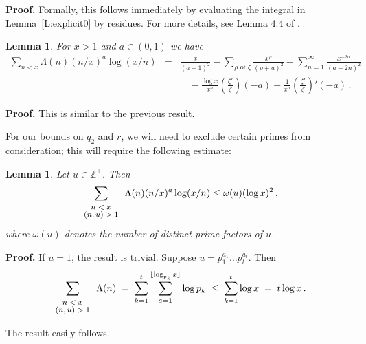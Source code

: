 \documentclass{amsart}
\newtheorem{lemma}[theorem]{Lemma}
\numberwithin{equation}{section}
\numberwithin{table}{section}
\begin{document}
\noindent\textbf{Proof.}
Formally, this follows immediately by evaluating the integral in Lemma~\ref{L:explicit0} by residues.
For more details, see Lemma 4.4 of \cite{bach:1990}.
{\raisebox{-.25ex}{\scalebox{.786}[1.272]{$\blacksquare$}}}

\begin{lemma}\label{L:explicit2}
  For $x>1$ and $a\in(0,1)$ we have
  \begin{eqnarray*}
  \sum_{n<x}
  \Lambda(n)(n/x)^a\log(x/n)
  &=&
   \frac{x}{(a+1)^2}
  -
  \sum_{\rho\text{ of $\zeta$}}
  \frac{x^\rho}{(\rho+a)^2}
   -
  \sum_{n=1}^\infty
  \frac{x^{-2n}}{(a-2n)^2}
  \\
  &&
  \quad
  -
  \frac{\log x}{x^a}
  \left(\frac{\zeta'}{\zeta}\right)(-a)
  -
  \frac{1}{x^a}
  \left(\frac{\zeta'}{\zeta}\right)'(-a)
  \,.
  \end{eqnarray*}
\end{lemma}

\noindent\textbf{Proof.}
This is similar to the previous result.
{\raisebox{-.25ex}{\scalebox{.786}[1.272]{$\blacksquare$}}}

\vspace{1ex}

For our bounds on $q_2$ and $r$, we will need to exclude certain primes
from consideration; this will require the following estimate:
\begin{lemma}\label{L:sumbound}
 Let $u\in{\mathbb{Z}}^+$.  Then
 $$ 
  \sum_{\footnotesize{\begin{array}{cc}n<x\\[-.5ex](n,u)>1\end{array}}}
 \Lambda(n)
 (n/x)^a
 \log(x/n) 
 \leq
 \omega(u)(\log x)^2
 \,,
 $$
 where $\omega(u)$ denotes the number of distinct prime factors of $u$.
\end{lemma}

\noindent\textbf{Proof.}
If $u=1$, the result is trivial.
Suppose $u=p_1^{a_1}\dots p_t^{a_t}$.  Then
\begin{eqnarray*}
  \sum_{\footnotesize{\begin{array}{cc}n<x\\[-.5ex](n,u)>1\end{array}}}
  \Lambda(n)
   \;=\;
   \sum_{k=1}^t
   \sum_{a=1}^{\lfloor \log_{p_k}x\rfloor}
   \log p_k
   \;\leq\;
   \sum_{k=1}^t
   \log x
   \;=\;
   t\log x
   \,.
\end{eqnarray*}

The result easily follows.
{\raisebox{-.25ex}{\scalebox{.786}[1.272]{$\blacksquare$}}}
\end{document}
